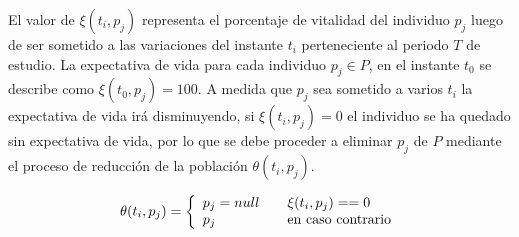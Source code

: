 El valor de $\xi (t_{i}, p_{j})$ representa el porcentaje de vitalidad del
individuo $p_{j}$ luego de ser sometido a las variaciones del instante
$t_{i}$ perteneciente al periodo $T$ de estudio. La expectativa de vida
para cada individuo $p_{j} \in P$, en el instante $t_{0}$ se describe como
$\xi (t_{0}, p_{j})= 100$. A medida que $p_{j}$ sea sometido a varios
$t_{i}$ la expectativa de vida irá disminuyendo, si $\xi (t_{i}, p_{j})= 0$ el
individuo se ha quedado sin expectativa de vida, por lo que se debe proceder
a eliminar $p_{j}$ de $P$ mediante el proceso de reducción de la población
$\theta (t_{i}, p_{j})$.

\begin{equation}
\theta (t_{i}, p_{j}) = \left\{
  \begin{array}{l l}
    p_{j} = null & \quad \xi(t_{i}, p_{j}) == 0 \\
    p_{j} & \quad \text{en caso contrario}
  \end{array} \right.
\end{equation}
